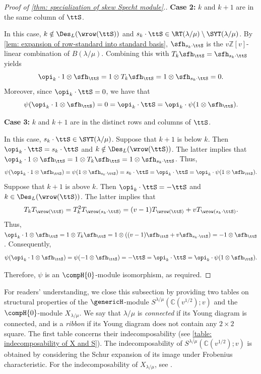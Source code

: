 \documentclass[12pt, reqno]{amsart}
\theoremstyle{plain}
\theoremstyle{definition}
\numberwithin{equation}{section}
\numberwithin{figure}{section}
\numberwithin{table}{section}
\def\Z{\mathbb Z}
\def\C{\mathbb C}
\begin{document}
\begin{proof}[Proof of \protect\cref{thm: specialization of skew Specht module}.]
\textbf{Case 2:} $k$ and $k+1$ are in the same column of $\ttS$.

In this case, $k \notin \Des_L(\wrow(\ttS))$ and $s_k \cdot \ttS \in \RT(\lambda/\mu) \setminus \SYT(\lambda/\mu)$.
By \cref{lem: expansion of row-standard into standard basis},  $\sfh_{s_k \cdot \ttS}$ is the $v \Z[v]$-linear combination of $B(\lambda/\mu)$.
Combining this with $T_k \sfh_{\ttS} = \sfh_{s_k \cdot \ttS}$ yields  
\[
\opi_k \cdot 1 \otimes \sfh_{\ttS} = 1 \otimes T_k \sfh_{\ttS} = 1 \otimes \sfh_{s_k \cdot \ttS} = 0.
\]
Moreover, since  $\opi_k \cdot \ttS = 0$, we have that  
\[
\psi(\opi_k \cdot 1 \otimes \sfh_{\ttS})  
= 0 = \opi_k \cdot \ttS 
= \opi_k \cdot \psi(1 \otimes \sfh_{\ttS}).
\]

\textbf{Case 3:} $k$ and $k+1$ are in the distinct rows and  columns of $\ttS$.  

In this case, $s_k \cdot \ttS \in \SYT(\lambda/\mu)$.
Suppose that $k+1$ is below $k$. 
Then $\opi_k \cdot \ttS = s_k \cdot \ttS$ and $k \notin \Des_L(\wrow(\ttS))$.
The latter implies that
$\opi_k \cdot 1 \otimes \sfh_{\ttS} 
= 1 \otimes T_k \sfh_{\ttS} 
= 1 \otimes \sfh_{s_k \cdot \ttS}$.
Thus,
\[
\psi(\opi_k \cdot 1 \otimes \sfh_{\ttS}) 
= \psi(1 \otimes \sfh_{s_k \cdot \ttS}) 
= s_k \cdot \ttS 
= \opi_k \cdot \ttS 
= \opi_k \cdot \psi(1 \otimes \sfh_{\ttS}).
\]
Suppose that $k+1$ is above $k$.
Then $\opi_k \cdot \ttS = -\ttS$ and $k \in \Des_L(\wrow(\ttS))$.
The latter implies that
\[
T_k T_{\wrow(\ttS)} = T_k^2 T_{\wrow(s_k \cdot \ttS)}    = (v-1) T_{\wrow(\ttS)} + v T_{\wrow(s_k \cdot \ttS)}.
\]
Thus,
$\opi_k \cdot 1 \otimes \sfh_{\ttS} 
= 1 \otimes T_k  \sfh_{\ttS} 
= 1 \otimes ((v-1)  \sfh_{\ttS} + v \sfh_{s_k \cdot \ttS})
= - 1 \otimes \sfh_{\ttS}$.
Consequently,
\[
\psi(\opi_k \cdot 1 \otimes \sfh_{\ttS}) = \psi(- 1 \otimes \sfh_{\ttS}) 
= -\ttS = \opi_k \cdot \ttS
= \opi_k \cdot \psi(1 \otimes \sfh_{\ttS}).
\]


Therefore, $\psi$ is an $\compH{0}$-module isomorphism, as required.
\end{proof}



For readers' understanding, 
we close this subsection by providing two tables on structural properties of the $\genericH$-module $S^{\lambda/\mu}(\C(v^{1/2});v)$ and the $\compH{0}$-module $X_{\lambda/\mu}$. 
We say that $\lambda/\mu$ is  \emph{connected} if its Young diagram is connected, and is a \emph{ribbon} if its Young diagram does not contain any $2 \times 2$ square.
The first table concerns their indecomposability (see \cref{table: indecomposability of X and S}).
The indecomposability of $S^{\lambda/\mu}(\C(v^{1/2});v)$ is obtained by considering the Schur expansion of its image under Frobenius characteristic.  
For the indecomposability of $X_{\lambda/\mu}$, see \cite[Proposition 7.3]{23KLO}.
\end{document}
